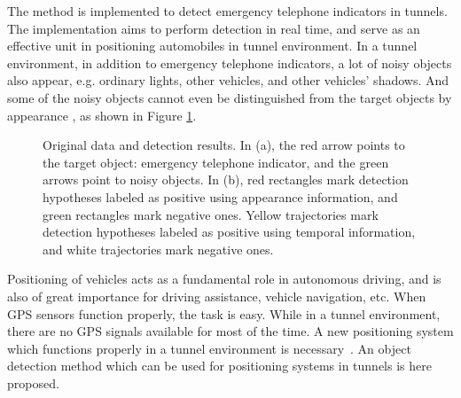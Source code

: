 The method is implemented to detect emergency telephone indicators in tunnels. The implementation aims to perform detection in real time, and serve as an effective unit in positioning automobiles in tunnel environment. In a tunnel environment, in addition to emergency telephone indicators, a lot of noisy objects also appear, e.g. ordinary lights, other vehicles, and other vehicles' shadows. And some of the noisy objects cannot even be distinguished from the target objects by appearance , as shown in Figure \ref{fig:first}.


\begin{figure}
\centering
{}
\caption[Target objects and detection results]{Original data and detection results. In (a), the red arrow points to the target object: emergency telephone indicator, and the green arrows point to noisy objects. In (b), red rectangles mark detection hypotheses labeled as positive using appearance information, and green rectangles mark negative ones. Yellow trajectories mark detection hypotheses labeled as positive using temporal information, and white trajectories mark negative ones.
}
\label{fig:first}
\end{figure}

Positioning of vehicles acts as a fundamental role in autonomous driving, and is also of great importance for driving assistance, vehicle navigation, etc. When GPS sensors function properly, the task is easy. While in a tunnel environment, there are no GPS signals available for most of the time. A new positioning system which functions properly in a tunnel environment is necessary~\citep{nig}. An object detection method which can be used for positioning systems in tunnels is here proposed.

